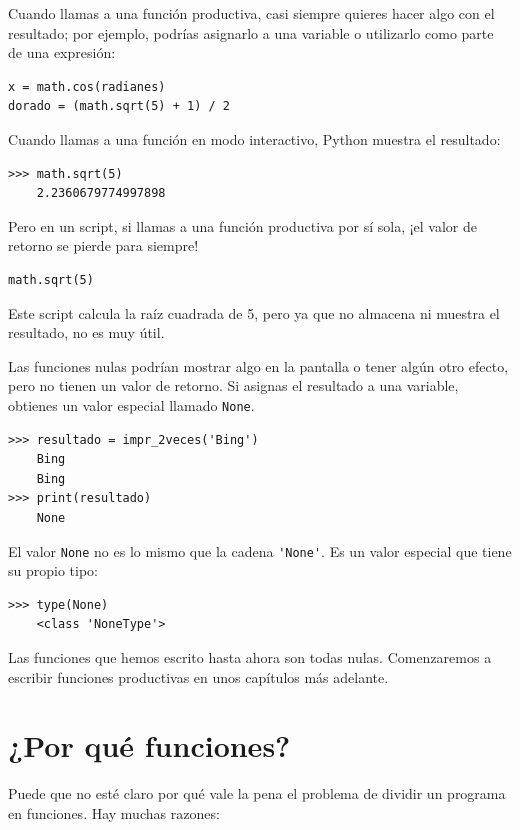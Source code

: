 \documentclass[10pt]{book}
\begin{document}
Cuando llamas a una función productiva, casi siempre
quieres hacer algo con el resultado; por ejemplo, podrías
asignarlo a una variable o utilizarlo como parte de una expresión:

\begin{verbatim}
x = math.cos(radianes)
dorado = (math.sqrt(5) + 1) / 2
\end{verbatim}
%
Cuando llamas a una función en modo interactivo, Python muestra
el resultado:

\begin{verbatim}
>>> math.sqrt(5)
    2.2360679774997898
\end{verbatim}
%
Pero en un script, si llamas a una función productiva por sí sola,
¡el valor de retorno se pierde para siempre!

\begin{verbatim}
math.sqrt(5)
\end{verbatim}
%
Este script calcula la raíz cuadrada de 5, pero ya que no almacena
ni muestra el resultado, no es muy útil.

Las funciones nulas podrían mostrar algo en la pantalla o tener algún
otro efecto, pero no tienen un valor de retorno.  Si
asignas el resultado a una variable, obtienes un valor especial llamado
{\tt None}.

\begin{verbatim}
>>> resultado = impr_2veces('Bing')
    Bing
    Bing
>>> print(resultado)
    None
\end{verbatim}
%
El valor {\tt None} no es lo mismo que la cadena \verb"'None'".
Es un valor especial que tiene su propio tipo:

\begin{verbatim}
>>> type(None)
    <class 'NoneType'>
\end{verbatim}
%
Las funciones que hemos escrito hasta ahora son todas nulas.  Comenzaremos
a escribir funciones productivas en unos capítulos más adelante.


\section{¿Por qué funciones?}

Puede que no esté claro por qué vale la pena el problema de dividir
un programa en funciones.  Hay muchas razones:
\end{document}

